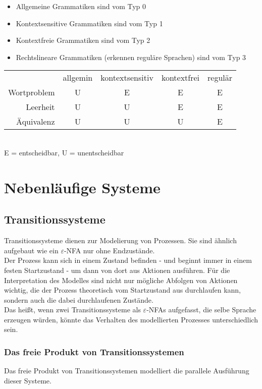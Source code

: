 \documentclass[11pt]{scrartcl}
\begin{document}
\begin{itemize}
	\item Allgemeine Grammatiken sind vom Typ 0
    \item Kontextsensitive Grammatiken sind vom Typ 1
    \item Kontextfreie Grammatiken sind vom Typ 2
    \item Rechtslineare Grammatiken (erkennen reguläre Sprachen) sind vom Typ 3
\end{itemize}

\begin{tabular}{ r|c|c|c|c }
              & allgemin & kontextsensitiv & kontextfrei & regulär \\
  Wortproblem & U & E & E & E \\
  Leerheit    & U & U & E & E \\
  Äquivalenz  & U & U & U & E
\end{tabular} \\
E = entscheidbar, U = unentscheidbar

\section{Nebenläufige Systeme}

\subsection{Transitionssysteme}

Transitionssysteme dienen zur Modelierung von Prozessen. Sie sind ähnlich aufgebaut wie ein $\varepsilon$-NFA nur ohne Endzustände.\\
Der Prozess kann sich in einem Zustand befinden - und beginnt immer in einem festen Startzustand - um dann von dort aus Aktionen ausführen. Für die Interpretation des Modelles sind nicht nur mögliche Abfolgen von Aktionen wichtig, die der Prozess theoretisch vom Startzustand aus durchlaufen kann, sondern auch die dabei durchlaufenen Zustände. \\
Das heißt, wenn zwei Transitionssysteme als $\varepsilon$-NFAs aufgefasst, die selbe Sprache erzeugen würden, könnte das Verhalten des modellierten Prozesses unterschiedlich sein.

\subsubsection{Das freie Produkt von Transitionssystemen}

Das freie Produkt von Transitionssystemen modelliert die parallele Ausführung dieser Systeme.
\end{document}
